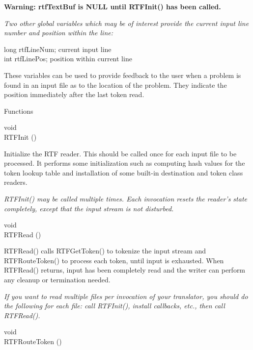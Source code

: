 \documentclass{article}
\begin{document}
\noindent
{\bf Warning: rtfTextBuf is NULL until RTFInit() has been called.



\noindent
{\bf {\em Two other global variables which may be of interest provide the 
current input line number and position within the line:





}}}
\noindent
long	rtfLineNum;	current input line\\
int	rtfLinePos;	position within current line






\noindent
These variables can be used to provide feedback to the user when a problem 
is found in an input file as to the location of the problem. They indicate 
the position immediately after the last token read.




\noindent
Functions






\noindent
void\\
RTFInit ()




\noindent
Initialize the RTF reader. This should be called once for each input file 
to be processed. It performs some initialization such as computing hash values 
for the token lookup table and installation of some built-in destination 
and token class readers.



\noindent
{\em RTFInit() may be called multiple times. Each invocation resets the reader's 
state completely, except that the input stream is not disturbed.



}
\noindent
void\\
RTFRead ()




\noindent
RTFRead() calls RTFGetToken() to tokenize the input stream and RTFRouteToken() 
to process each token, until input is exhausted. When RTFRead() returns, 
input has been completely read and the writer can perform any cleanup or 
termination needed.



\noindent
{\em If you want to read multiple files per invocation of your translator, 
you should do the following for each file: call RTFInit(), install callbacks, 
etc., then call RTFRead().



}
\noindent
void\\
RTFRouteToken ()
\end{document}
